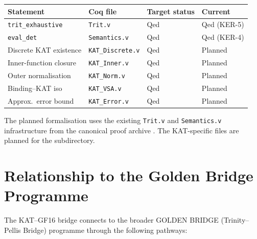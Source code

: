 \begin{longtable}[]{@{}llll@{}}
\toprule\noalign{}
Statement & Coq file & Target status & Current \\
\midrule\noalign{}
\endhead
\bottomrule\noalign{}
\endlastfoot
\texttt{trit\_exhaustive} & \texttt{Trit.v} & Qed & Qed (KER-5) \\
\texttt{eval\_det} & \texttt{Semantics.v} & Qed & Qed (KER-4) \\
Discrete KAT existence & \texttt{KAT\_Discrete.v} & Qed & Planned \\
Inner-function closure & \texttt{KAT\_Inner.v} & Qed & Planned \\
Outer normalisation & \texttt{KAT\_Norm.v} & Qed & Planned \\
Binding--KAT iso & \texttt{KAT\_VSA.v} & Qed & Planned \\
Approx.\ error bound & \texttt{KAT\_Error.v} & Qed & Planned \\
\end{longtable}

The planned formalisation uses the existing \texttt{Trit.v} and
\texttt{Semantics.v} infrastructure from the canonical proof archive
. The KAT-specific files are
planned for the  subdirectory.

\section{Relationship to the Golden Bridge Programme}
\label{app:G-golden-bridge}

The KAT--GF16 bridge connects to the broader GOLDEN BRIDGE
(Trinity--Pellis Bridge) programme through the following pathways:

